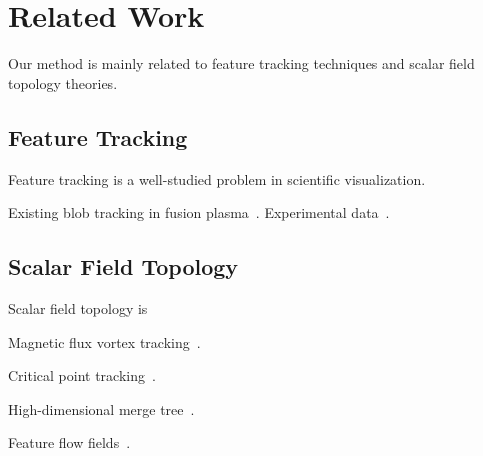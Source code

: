 \section{Related Work}

Our method is mainly related to feature tracking techniques and scalar field topology theories.  

\subsection{Feature Tracking}

Feature tracking is a well-studied problem in scientific visualization.  

Existing blob tracking in fusion plasma~\cite{WuWSCCSCK16}.  Experimental data~\cite{DavisKMRSZ14}.  



\subsection{Scalar Field Topology}

Scalar field topology is 



Magnetic flux vortex tracking~\cite{GuoPPKG16, GuoPG17, PhillipsGPKG16, PhillipsPKG15}.

Critical point tracking~\cite{ReininghausKWH12}.

High-dimensional merge tree~\cite{OesterlingHWMS17}. 

Feature flow fields~\cite{TheiselS03}. 
